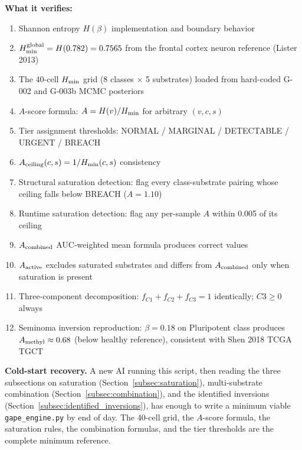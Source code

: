 \documentclass[12pt,a4paper]{article}
\begin{document}
\textbf{What it verifies:}
\begin{enumerate}
\item Shannon entropy $H(\beta)$ implementation and boundary behavior
\item $H_{\rm min}^{\rm global} = H(0.782) = 0.7565$ from the frontal cortex
  neuron reference (Lister 2013)
\item The 40-cell $H_{\rm min}$ grid (8 classes $\times$ 5 substrates) loaded
  from hard-coded G-002 and G-003b MCMC posteriors
\item $A$-score formula: $A = H(v) / H_{\rm min}$ for arbitrary $(v, c, s)$
\item Tier assignment thresholds: NORMAL / MARGINAL / DETECTABLE / URGENT / BREACH
\item $A_{\rm ceiling}(c,s) = 1 / H_{\rm min}(c,s)$ consistency
\item Structural saturation detection: flag every class-substrate pairing
  whose ceiling falls below BREACH ($A = 1.10$)
\item Runtime saturation detection: flag any per-sample $A$ within 0.005 of
  its ceiling
\item $A_{\rm combined}$ AUC-weighted mean formula produces correct values
\item $A_{\rm active}$ excludes saturated substrates and differs from
  $A_{\rm combined}$ only when saturation is present
\item Three-component decomposition: $f_{C1} + f_{C2} + f_{C3} = 1$ identically;
  $C3 \ge 0$ always
\item Seminoma inversion reproduction: $\beta = 0.18$ on Pluripotent class
  produces $A_{\rm methyl} \approx 0.68$ (below healthy reference), consistent
  with Shen 2018 TCGA TGCT
\end{enumerate}

\textbf{Cold-start recovery.} A new AI running this script, then reading the
three subsections on saturation (Section~\ref{subsec:saturation}),
multi-substrate combination (Section~\ref{subsec:combination}), and the
identified inversions (Section~\ref{subsec:identified_inversions}), has
enough to write a minimum viable \texttt{gape\_engine.py} by end of day.
The 40-cell grid, the $A$-score formula, the saturation rules, the combination
formulas, and the tier thresholds are the complete minimum reference.
\end{document}
